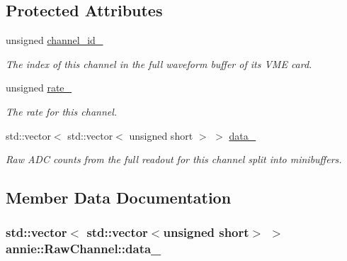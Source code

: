 \subsection*{Protected Attributes}
\begin{DoxyCompactItemize}
\item 
\hypertarget{classannie_1_1RawChannel_ad169e3385ece998437d8cf01000efcba}{
unsigned \hyperlink{classannie_1_1RawChannel_ad169e3385ece998437d8cf01000efcba}{channel\_\-id\_\-}}
\label{classannie_1_1RawChannel_ad169e3385ece998437d8cf01000efcba}

\begin{DoxyCompactList}\small\item\em The index of this channel in the full waveform buffer of its VME card. \item\end{DoxyCompactList}\item 
\hypertarget{classannie_1_1RawChannel_aea856777ad9bdf78603c717df2e8b620}{
unsigned \hyperlink{classannie_1_1RawChannel_aea856777ad9bdf78603c717df2e8b620}{rate\_\-}}
\label{classannie_1_1RawChannel_aea856777ad9bdf78603c717df2e8b620}

\begin{DoxyCompactList}\small\item\em The rate for this channel. \item\end{DoxyCompactList}\item 
std::vector$<$ std::vector$<$ unsigned short $>$ $>$ \hyperlink{classannie_1_1RawChannel_a56cecbafdc1dfcce9c8a3a4d90b528a1}{data\_\-}
\begin{DoxyCompactList}\small\item\em Raw ADC counts from the full readout for this channel split into minibuffers. \item\end{DoxyCompactList}\end{DoxyCompactItemize}


\subsection{Member Data Documentation}
\hypertarget{classannie_1_1RawChannel_a56cecbafdc1dfcce9c8a3a4d90b528a1}{
\subsubsection[{data\_\-}]{\setlength{\rightskip}{0pt plus 5cm}std::vector$<$ std::vector$<$unsigned short$>$ $>$ {\bf annie::RawChannel::data\_\-}}}
\label{classannie_1_1RawChannel_a56cecbafdc1dfcce9c8a3a4d90b528a1}



